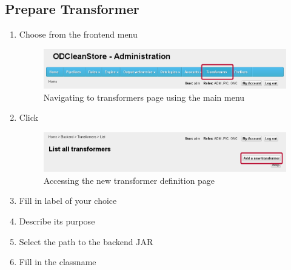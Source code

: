 \subsection*{Prepare Transformer}
\label{sec:prepareTransformer}
\begin{enumerate}

\vspace*{0.2\textheight}

	\item Choose  from the frontend menu

\begin{figure}[!ht]
    \centering
    \includegraphics[width=\textwidth]{images/fe-walkthrough-menu-transformers.png}
    \caption{Navigating to transformers page using the main menu}
	\label{fig:feWTMenuTransformers}
\end{figure}
\FloatBarrier

\vspace*{0.2\textheight}

	\item Click 

\begin{figure}[!ht]
    \centering
    \includegraphics[width=\textwidth]{images/fe-walkthrough-add-transformer.png}
    \caption{Accessing the new transformer definition page}
	\label{fig:feWTAddTransformer}
\end{figure}
\FloatBarrier

\newpage

\vspace*{0.2\textheight}

	\item Fill in label of your choice
	
	\item Describe its purpose
	
	\item Select the path to the backend JAR
	
	\item Fill in the classname
	

\end{enumerate}
